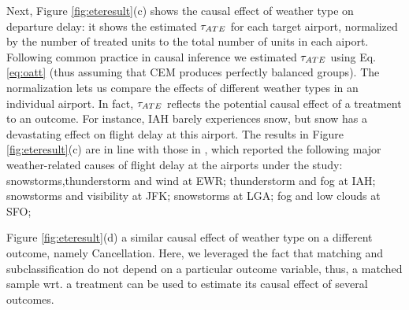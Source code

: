 Next, Figure \ref{fig:eteresult}(c) shows the causal effect of weather
type on departure delay: it shows the estimated ${\tau_{ATE}}$ for each target
airport, normalized by the number of treated units to the total number
of units in each aiport.  Following common practice in causal
inference we estimated ${\tau_{ATE}}$ using Eq. \ref{eq:oatt} (thus assuming
that CEM produces perfectly balanced groups). The normalization lets
us compare the effects of different weather types in an individual
airport. In fact, ${\tau_{ATE}}$ reflects the potential causal effect of a
treatment to an outcome. For instance, IAH barely experiences snow,
but snow has a devastating effect on flight delay at this airport. The
results in Figure \ref{fig:eteresult}(c) are in line with those in
\cite{weather}, which reported the following major weather-related
causes of flight delay at the airports under the study:
snowstorms,thunderstorm and wind at EWR; thunderstorm and fog at IAH;
snowstorms and visibility at JFK; snowstorms at LGA; fog and low
clouds at SFO;


Figure \ref{fig:eteresult}(d) a similar causal effect of weather type
on a different outcome, namely Cancellation. Here, we leveraged the
fact that matching and subclassification do not depend on a particular
outcome variable, thus, a matched sample wrt. a treatment can be used
to estimate its causal effect of several outcomes.









